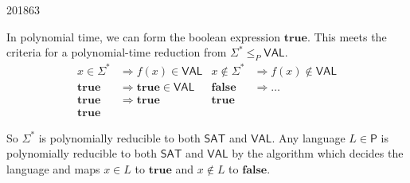 \documentclass[10pt,\jkfside,a4paper]{article}
\begin{document}
\begin{examquestion}{2018}{6}{3}
\begin{enumerate}[label=(\alph*)]
In polynomial time, we can form the boolean expression $\mathbf{true}$. This
meets the criteria for a polynomial-time reduction from $\Sigma^*\le_P
\mathsf{VAL}$.
\begin{align*}
x \in \Sigma^* &\Longrightarrow f(x) \in \mathsf{VAL} &
x \notin \Sigma^* &\Longrightarrow f(x) \notin \mathsf{VAL} \\
\mathbf{true} &\Longrightarrow \mathbf{true} \in \mathsf{VAL} &
\mathbf{false} &\Longrightarrow \dots \\
\mathbf{true} &\Longrightarrow \mathbf{true} &
\mathbf{true} \\
\mathbf{true}
\end{align*}

So $\Sigma^*$ is polynomially reducible to both $\mathsf{SAT}$ and
$\mathsf{VAL}$. Any language $L \in \mathsf{P}$ is polynomially reducible
to both $\mathsf{SAT}$ and $\mathsf{VAL}$ by the algorithm which decides
the language and maps $x \in L$ to $\mathbf{true}$ and $x \notin L$ to
$\mathbf{false}$.

\end{enumerate}

\end{examquestion}
\end{document}
